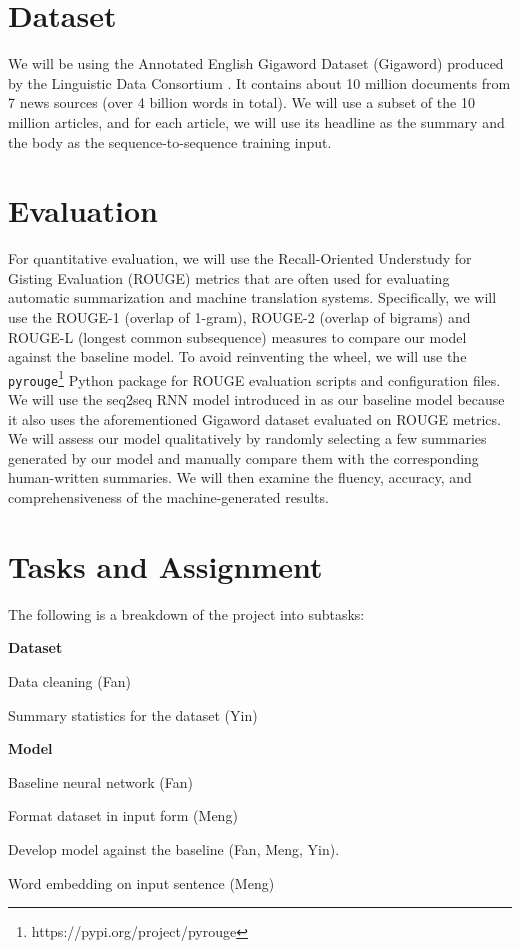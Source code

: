 \section{Dataset}
We will be using the Annotated English Gigaword Dataset (Gigaword) produced by the Linguistic Data Consortium \cite{napoles2012annotated}. It contains about 10 million documents from 7 news sources (over 4 billion words in total). We will use a subset of the 10 million articles, and for each article, we will use its headline as the summary and the body as the sequence-to-sequence training input.

\section{Evaluation}
For quantitative evaluation, we will use the Recall-Oriented Understudy for Gisting Evaluation (ROUGE) metrics that are often used for evaluating automatic summarization and machine translation systems. Specifically, we will use the ROUGE-1 (overlap of 1-gram), ROUGE-2 (overlap of bigrams) and ROUGE-L (longest common subsequence) measures to compare our model against the baseline model. To avoid reinventing the wheel, we will use the \texttt{pyrouge}\footnote{https://pypi.org/project/pyrouge} Python package for ROUGE evaluation scripts and configuration files. 
We will use the seq2seq RNN model introduced in \cite{nallapati2016abstractive} as our baseline model because it also uses the aforementioned Gigaword dataset evaluated on ROUGE metrics. We will assess our model qualitatively by randomly selecting a few summaries generated by our model and manually compare them with the corresponding human-written summaries. We will then examine the fluency, accuracy, and comprehensiveness of the machine-generated results.

\section{Tasks and Assignment}

The following is a breakdown of the project into subtasks:

\noindent
\textbf{Dataset}
\begin{compactitem}
\item Data cleaning (Fan)
\item Summary statistics for the dataset (Yin)
\end{compactitem}

\noindent
\textbf{Model}
\begin{compactitem}
\item Baseline neural network (Fan)
\item Format dataset in input form  (Meng)
\item Develop model against the baseline (Fan, Meng, Yin).
\item Word embedding on input sentence (Meng)
\end{compactitem}

